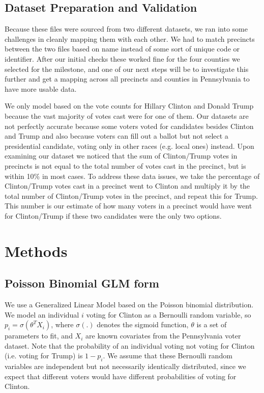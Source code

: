 \documentclass[10pt, letterpaper]{article}
\begin{document}
\subsection{Dataset Preparation and Validation}

Because these files were sourced from two different datasets, we ran into some challenges in cleanly mapping them with each other. We had to match precincts between the two files based on name instead of some sort of unique code or identifier. After our initial checks these worked fine for the four counties we selected for the milestone, and one of our next steps will be to investigate this further and get a mapping across all precincts and counties in Pennsylvania to have more usable data. 

We only model based on the vote counts for Hillary Clinton and Donald Trump because the vast majority of votes cast were for one of them. Our datasets are not perfectly accurate because some voters voted for candidates besides Clinton and Trump and also because voters can fill out a ballot but not select a presidential candidate, voting only in other races (e.g. local ones) instead. Upon examining our dataset we noticed that the sum of Clinton/Trump votes in precincts is not equal to the total number of votes cast in the precinct, but is within 10\% in most cases. To address these data issues, we take the percentage of Clinton/Trump votes cast in a precinct went to Clinton and multiply it by the total number of Clinton/Trump votes in the precinct, and repeat this for Trump. This number is our estimate of how many voters in a precinct would have went for Clinton/Trump if these two candidates were the only two options.

\section{Methods}

\subsection{Poisson Binomial GLM form}

We use a Generalized Linear Model based on the Poisson binomial distribution. We model an individual $i$ voting for Clinton as a Bernoulli random variable, so $p_i = \sigma(\theta^TX_i)$, where $\sigma(.)$ denotes the sigmoid function, $\theta$ is a set of parameters to fit, and $X_i$ are known covariates from the Pennsylvania voter dataset. Note that the probability of an individual voting not voting for Clinton (i.e. voting for Trump) is $1 - p_i$. We assume that these Bernoulli random variables are independent but not necessarily identically distributed, since we expect that different voters would have different probabilities of voting for Clinton.
\end{document}
